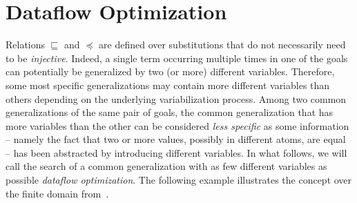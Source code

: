 \section{Dataflow Optimization}\label{section-relation-2}

Relations $\sqsubseteq$ and $\preceq$ are defined over substitutions that do not necessarily need to be \textit{injective}. Indeed, a single term occurring multiple times in one of the goals can potentially be generalized by two (or more) different variables. Therefore, some most specific generalizations may contain more different variables than others depending on the underlying variabilization process. 
Among two common generalizations of the same pair of goals, the common generalization that has more variables than the other can be considered \textit{less specific} as some information -- namely the fact that two or more values, possibly in different atoms, are equal -- has been abstracted by introducing different variables. In what follows, we will call the search of a common generalization with as few different variables as possible \textit{dataflow optimization}. The following example illustrates the concept over the finite domain from~\cite{clpbfd}. 

